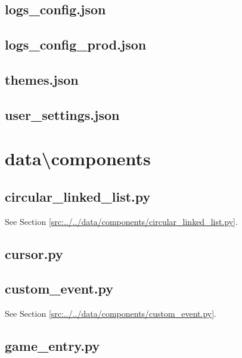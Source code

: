 \documentclass[../main/main.tex]{subfiles}
\begin{document}
\subsection{logs\_config.json}

\label{src:data/app_data/logs_config.json}

\subsection{logs\_config\_prod.json}

\label{src:data/app_data/logs_config_prod.json}

\subsection{themes.json}

\label{src:data/app_data/themes.json}

\subsection{user\_settings.json}

\label{src:data/app_data/user_settings.json}

\section{data\textbackslash components}
\subsection{circular\_linked\_list.py}
See Section \ref{src:../../data/components/circular_linked_list.py}.

\subsection{cursor.py}

\label{src:data/components/cursor.py}

\subsection{custom\_event.py}
See Section \ref{src:../../data/components/custom_event.py}.

\subsection{game\_entry.py}

\label{src:data/components/game_entry.py}
\end{document}
